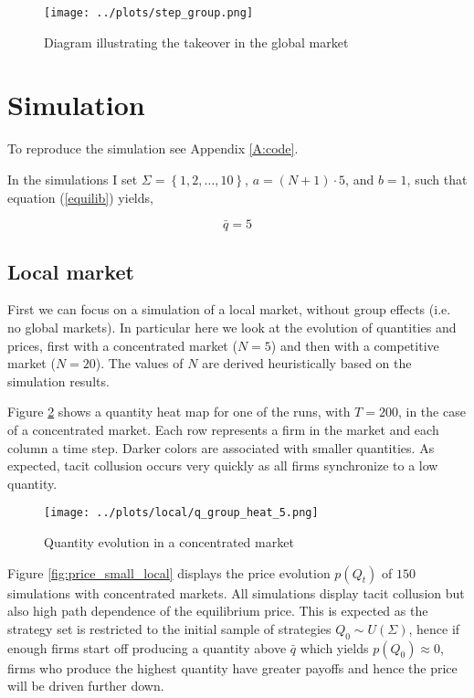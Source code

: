 \documentclass[american]{scrartcl}
\newcommand{\set}[1]{\left\{#1\right\}}
\begin{document}
\begin{center}
    \begin{figure}[H]
        \center
        \texttt{[image: ../plots/step\_group.png]}
        \caption{Diagram illustrating the takeover in the global market}
        \label{fig:diagram}
    \end{figure}
\end{center}


\section{Simulation}

To reproduce the simulation see Appendix \ref{A:code}.

In the simulations I set $\Sigma = \set{1, 2, \ldots, 10}$, $a = (N + 1) \cdot 5$, and $b = 1$, such that equation (\ref{equilib}) yields,

\begin{equation}
    \bar{q} = 5
\end{equation}

\subsection{Local market}

First we can focus on a simulation of a local market, without group effects (i.e. no global markets). In particular here we look at the evolution of quantities and prices, first with a concentrated market ($N = 5$) and then with a competitive market ($N = 20$). The values of $N$ are derived heuristically based on the simulation results.

Figure \ref{fig:small_local} shows a quantity heat map for one of the runs, with $T = 200$, in the case of a concentrated market. Each row represents a firm in the market and each column a time step. Darker colors are associated with smaller quantities. As expected, tacit collusion occurs very quickly as all firms synchronize to a low quantity.

\begin{center}
    \begin{figure}[H]
        \center
        \texttt{[image: ../plots/local/q\_group\_heat\_5.png]}
        \caption{Quantity evolution in a concentrated market}
        \label{fig:small_local}
    \end{figure}
\end{center}

Figure \ref{fig:price_small_local} displays the price evolution $p(Q_t)$ of $150$ simulations with concentrated markets. All simulations display tacit collusion but also high path dependence of the equilibrium price. This is expected as the strategy set is restricted to the initial sample of strategies $Q_0 \sim U(\Sigma)$, hence if enough firms start off producing a quantity above $\bar{q}$ which yields $p(Q_0) \approx 0$, firms who produce the highest quantity have greater payoffs and hence the price will be driven further down.
\end{document}
